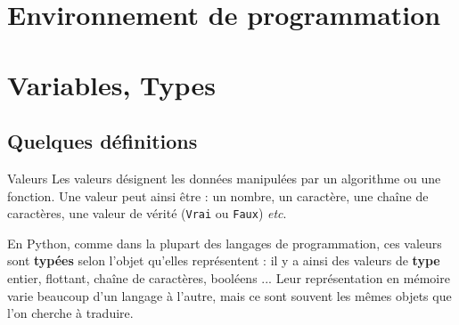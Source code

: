 \def\xxactivite{Cours}

\fichefalse \proftrue \tdfalse \courstrue

\def\xxnumchapitre{Chapitre 1 \vspace{.2cm}}
\def\xxchapitre{\hspace{.12cm} Découverte de l'algorithmique et de la programmation}

\def\xxcompetences{%
\textsl{%
\textbf{Savoirs et compétences :}\\
\begin{itemize}[label=\ding{112},font=\color{bleuxp}] 
\item \textit{Mod2.C1 : }Chaîne d’énergie et d'information
\item \textit{Mod2.C8 : }Linéarisation des systèmes non linéaires	
\item \textit{Mod3.C1 : }Point de fonctionnement : non-linéarités (hystérésis, saturation, seuil)
\end{itemize}
}}

\def\xxfigures{
}%



\setlength{\columnseprule}{.1pt}

\vspace{2cm}
\pagestyle{fancy}
\thispagestyle{plain}







\section{Environnement de programmation}

\section{Variables, Types}

\subsection{Quelques définitions}
\begin{defi}{Valeurs}
Les valeurs désignent les données manipulées par un algorithme ou une fonction. Une valeur 
peut ainsi être  : un nombre, un caractère, une chaîne de caractères, une valeur de vérité 
(\texttt{Vrai} ou \texttt{Faux}) \textit{etc}.

En Python, comme dans la plupart des langages de programmation, ces valeurs sont \textbf{typées} selon l'objet qu'elles représentent : il y a ainsi des valeurs de \textbf{type} entier, flottant, chaîne de caractères, booléens ...   Leur représentation en mémoire varie beaucoup d'un langage à l'autre, mais ce sont souvent les mêmes objets que l'on 
cherche à traduire.
\end{defi}


